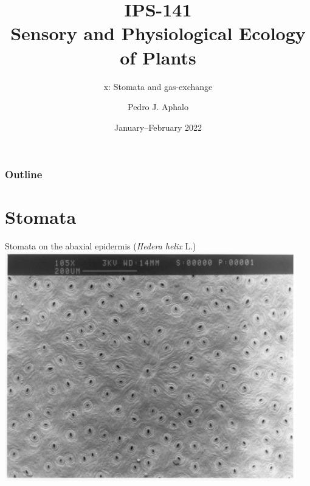 \documentclass[10pt]{beamer}\usepackage[]{graphicx}\usepackage[]{color}
\begin{document}
\title{IPS-141\\Sensory and Physiological Ecology of  Plants}
\subtitle{x: Stomata and gas-exchange}
\author{Pedro J. Aphalo}
\date{January--February 2022}

  \begin{frame}
    \maketitle
  \end{frame}




  \begin{frame}
    \frametitle{Outline}
    \tableofcontents
  \end{frame}

\section{Stomata}

\begin{frame}{Stomata on the abaxial epidermis (\emph{Hedera helix} L.)}
 \centering
    \includegraphics[width=0.95\textwidth]{photos/ivy-leaf-abax-epidermis-lowres}
\end{frame}
\end{document}
